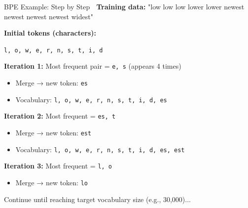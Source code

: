 \documentclass[aspectratio=169]{beamer}
\begin{document}
\begin{frame}[shrink=10]{BPE Example: Step by Step 👣}
    \textbf{Training data:} "low low low lower lower newest newest newest newest widest"

    \vspace{0.5em}
    \textbf{Initial tokens (characters):}
    \begin{center}
        \texttt{l, o, w, e, r, n, s, t, i, d}
    \end{center}

    \vspace{0.5em}
    \textbf{Iteration 1:} Most frequent pair = \texttt{e, s} (appears 4 times)
    \begin{itemize}\setlength{\itemsep}{0pt}
        \item Merge → new token: \texttt{es}
        \item Vocabulary: \texttt{l, o, w, e, r, n, s, t, i, d, es}
    \end{itemize}

    \vspace{0.3em}
    \textbf{Iteration 2:} Most frequent = \texttt{es, t}
    \begin{itemize}\setlength{\itemsep}{0pt}
        \item Merge → new token: \texttt{est}
        \item Vocabulary: \texttt{l, o, w, e, r, n, s, t, i, d, es, est}
    \end{itemize}

    \vspace{0.3em}
    \textbf{Iteration 3:} Most frequent = \texttt{l, o}
    \begin{itemize}\setlength{\itemsep}{0pt}
        \item Merge → new token: \texttt{lo}
    \end{itemize}

    \vspace{0.3em}
    Continue until reaching target vocabulary size (e.g., 30,000)...
\end{frame}
\end{document}
